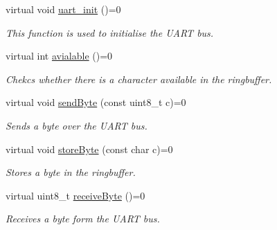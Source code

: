 \begin{DoxyCompactItemize}
\item 
virtual void \hyperlink{classuart__abstract_a44203f54f9cdbe8c3ea71ad65d3be62b}{uart\+\_\+init} ()=0
\begin{DoxyCompactList}\small\item\em This function is used to initialise the U\+A\+RT bus. \end{DoxyCompactList}\item 
\mbox{\label{classuart__abstract_a38f7efba4039c82f8c70a1891bb9a577}} 
virtual int \hyperlink{classuart__abstract_a38f7efba4039c82f8c70a1891bb9a577}{avialable} ()=0
\begin{DoxyCompactList}\small\item\em Chekcs whether there is a character available in the ringbuffer. \end{DoxyCompactList}\item 
\mbox{\label{classuart__abstract_a8956fc6951a4b5860f0ef44b424929bb}} 
virtual void \hyperlink{classuart__abstract_a8956fc6951a4b5860f0ef44b424929bb}{send\+Byte} (const uint8\+\_\+t c)=0
\begin{DoxyCompactList}\small\item\em Sends a byte over the U\+A\+RT bus. \end{DoxyCompactList}\item 
\mbox{\label{classuart__abstract_ac1029a0f07ce2f8880f2b388378bbfb4}} 
virtual void \hyperlink{classuart__abstract_ac1029a0f07ce2f8880f2b388378bbfb4}{store\+Byte} (const char c)=0
\begin{DoxyCompactList}\small\item\em Stores a byte in the ringbuffer. \end{DoxyCompactList}\item 
\mbox{\label{classuart__abstract_ad26f90ebb38ac73e23693cc5aafc3954}} 
virtual uint8\+\_\+t \hyperlink{classuart__abstract_ad26f90ebb38ac73e23693cc5aafc3954}{receive\+Byte} ()=0
\begin{DoxyCompactList}\small\item\em Receives a byte form the U\+A\+RT bus. \end{DoxyCompactList}\item 
\mbox{\label{classuart__abstract_a8a10405e3e52c8175899a443871c1598}} 

\end{DoxyCompactItemize}
